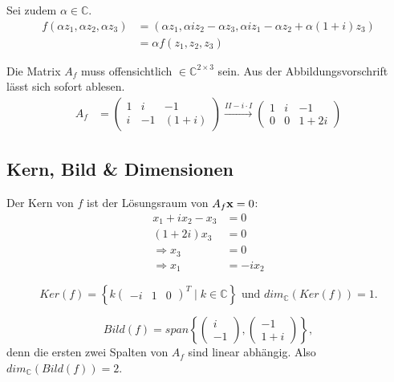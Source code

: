 \documentclass{../mfa}
\begin{document}
Sei zudem $\alpha \in \mathbb{C}$.
\begin{align*}
   f(\alpha z_1, \alpha z_2, \alpha z_3) & = (\alpha z_1, \alpha i z_2 - \alpha z_3, \alpha i z_1 - \alpha z_2 + \alpha (1+i)z_3) \\
                                         & = \alpha f(z_1, z_2, z_3)
\end{align*}

Die Matrix $A_f$ muss offensichtlich $\in \mathbb{C}^{2 \times 3}$ sein.
Aus der Abbildungsvorschrift lässt sich sofort ablesen.
\begin{align*}
A_f &= \begin{pmatrix} 1 & i & -1 \\ i & -1 & (1+i) \end{pmatrix}
\xrightarrow{II - i\cdot I} \begin{pmatrix} 1 & i & -1 \\ 0 & 0 & 1 +2i\end{pmatrix}
\end{align*}

\subsection{Kern, Bild \& Dimensionen}

Der Kern von $f$ ist der Lösungsraum von $A_f\mathbf{x} = 0$:
\begin{align*}
   x_1 + ix_2 -x_3 & = 0     \\
   (1+2i)x_3       & = 0     \\
   \Rightarrow x_3 & = 0     \\
   \Rightarrow x_1 & = -ix_2
\end{align*}

\newcommand{\inlinepmatrix}[1]{\begin{pmatrix}#1\end{pmatrix}}

\begin{equation*}
   Ker(f) = \left\{k \begin{pmatrix}-i & 1 & 0\end{pmatrix}^T \mid k \in
\mathbb{C} \right\} \text{ und } dim_\mathbb{C}(Ker(f)) = 1.
\end{equation*}

\begin{equation*}
   Bild(f) = span\left\{\inlinepmatrix{i \\ -1}, \inlinepmatrix{-1 \\
   1+i}\right\},
\end{equation*}
denn die ersten zwei Spalten von $A_f$ sind linear abhängig.
Also $dim_\mathbb{C}(Bild(f)) = 2$.
\end{document}
